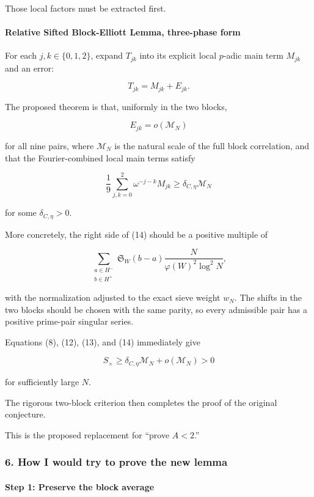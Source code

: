 Those local factors must be extracted first.

\paragraph{Relative Sifted Block-Elliott Lemma, three-phase form}

For each \(j,k\in\{0,1,2\}\), expand \(T_{jk}\) into its explicit local \(p\)-adic main term \(M_{jk}\) and an error:

\[
T_{jk}=M_{jk}+E_{jk}.
\tag{12}
\]

The proposed theorem is that, uniformly in the two blocks,

\[
\boxed{
E_{jk}
=
o(\mathcal M_N)
}
\tag{13}
\]

for all nine pairs, where \(\mathcal M_N\) is the natural scale of the full block correlation, and that the Fourier-combined local main terms satisfy

\[
\boxed{
\frac19
\sum_{j,k=0}^2
\omega^{-j-k}M_{jk}
\ge
\delta_{C,\eta}\mathcal M_N
}
\tag{14}
\]

for some \(\delta_{C,\eta}>0\).

More concretely, the right side of (14) should be a positive multiple of

\[
\sum_{\substack{a\in H^-\\b\in H^+}}
\mathfrak S_W(b-a)
\frac{N}{\varphi(W)^2\log^2N},
\tag{15}
\]

with the normalization adjusted to the exact sieve weight \(w_N\). The shifts in the two blocks should be chosen with the same parity, so every admissible pair has a positive prime-pair singular series.

Equations (8), (12), (13), and (14) immediately give

\[
S_\times
\ge
\delta_{C,\eta}\mathcal M_N+o(\mathcal M_N)>0
\]

for sufficiently large \(N\).

The rigorous two-block criterion then completes the proof of the original conjecture.

This is the proposed replacement for “prove \(A<2\).”

\medskip
\medskip


\subsubsection*{6. How I would try to prove the new lemma}

\paragraph{Step 1: Preserve the block average}

